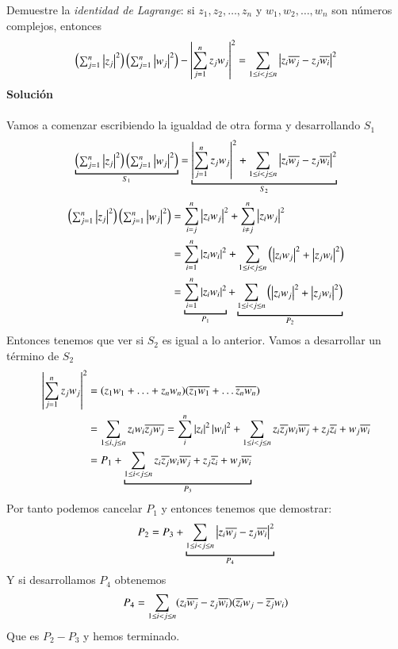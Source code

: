     \begin{ex}[H1.4]
        Demuestre la \textit{identidad de Lagrange}: si $z_1, z_2, \ldots, z_n$ y $w_1, w_2, \ldots, w_n$ son números complejos, entonces
        $$
            \px{\sum_{j=1}^{n} \vabs{z_j}^2} \px{\sum_{j=1}^n \vabs{w_j}^2} - \vabs{\sum_{j=1}^n z_jw_j}^2 = \sum_{1\leq i<j\leq n} \vabs{z_i \cnj{w_j} - z_j \cnj{w_i}}^2
        $$
        \textbf{Solución}\\\\
        Vamos a comenzar escribiendo la igualdad de otra forma y desarrollando $S_1$
        $$
        \underbracket{\px{\sum_{j=1}^{n} \vabs{z_j}^2} \px{\sum_{j=1}^n \vabs{w_j}^2}}_{S_1} = \underbracket{\vabs{\sum_{j=1}^n z_jw_j}^2 + \sum_{1\leq i<j\leq n} \vabs{z_i \cnj{w_j} - z_j \cnj{w_i}}^2}_{S_2}
        $$
        \begin{align*}
            \px{\sum_{j=1}^{n} \vabs{z_j}^2} \px{\sum_{j=1}^n \vabs{w_j}^2} &= \sum_{i=j}^n \vabs{z_iw_j}^2 + \sum_{i\neq j}^n \vabs{z_iw_j}^2\\
            &= \sum_{i=1}^n \vabs{z_iw_i}^2 + \sum_{1 \leq i < j \leq n} \px{\vabs{z_iw_j}^2 + \vabs{z_jw_i}^2}\\
            &= \underbracket{\sum_{i=1}^n \vabs{z_iw_i}^2}_{P_1}+ \underbracket{\sum_{1 \leq i < j \leq n} \px{\vabs{z_iw_j}^2 + \vabs{z_jw_i}^2}}_{P_2}\\
        \end{align*}
        Entonces tenemos que ver si $S_2$ es igual a lo anterior. Vamos a desarrollar un término de $S_2$
        \begin{align*}
            \vabs{\sum_{j=1}^n z_jw_j}^2 &= (z_1w_1 + \ldots + z_nw_n)(\cnj{z_1}\cnj{w_1} + \ldots \cnj{z_n}\cnj{w_n})\\
            &= \sum_{1 \leq i, j \leq n} z_iw_i\cnj{z_j}\cnj{w_j} = \sum_i^n \vabs{z_i}^2 \vabs{w_i}^2 + \sum_{1 \leq i < j \leq n} z_i\cnj{z_j}w_i\cnj{w_j} + z_j\cnj{z_i} + w_j\cnj{w_i}\\
            &= P_1 + \underbracket{\sum_{1 \leq i < j \leq n} z_i\cnj{z_j}w_i\cnj{w_j} + z_j\cnj{z_i} + w_j\cnj{w_i}}_{P_3}
        \end{align*}
        Por tanto podemos cancelar $P_1$ y entonces tenemos que demostrar:
        $$
            P_2 = P_3 + \underbracket{\sum_{1 \leq i < j \leq n} \vabs{z_i\cnj{w_j} - z_j\cnj{w_i}}^2}_{P_4}
        $$
        Y si desarrollamos $P_4$ obtenemos
        $$
            P_4 = \sum_{1 \leq i < j \leq n} (z_i\overline{w_j} - z_j\overline{w_i}) (\overline{z_i} w_j  - \overline{z_j} w_i )
        $$
        Que es $P_2 - P_3$ y hemos terminado.
    \end{ex}

